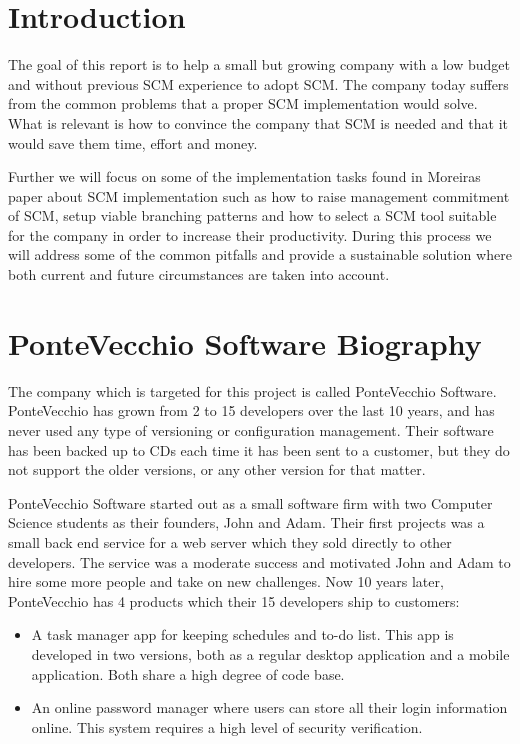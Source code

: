 \documentclass[10pt]{article}
\begin{document}
\section{Introduction}
The goal of this report is to help a small but growing company with a low budget and without previous SCM experience to adopt SCM. The company today suffers from the common problems that a proper SCM implementation would solve. What is relevant is how to convince the company that SCM is needed and that it would save them time, effort and money. 

\noindent Further we will focus on some of the implementation tasks found in Moreiras \cite{Moreira} paper about SCM implementation such as how to raise management commitment of SCM, setup viable branching patterns and how to select a SCM tool suitable for the company in order to increase their productivity. During this process we will address some of the common pitfalls and provide a sustainable solution where both current and future circumstances are taken into account.

\section{PonteVecchio Software Biography}
The company which is targeted for this project is called PonteVecchio Software. PonteVecchio has grown from 2 to 15 developers over the last 10 years, and has never used any type of versioning or configuration management. Their software has been backed up to CDs each time it has been sent to a customer, but they do not support the older versions, or any other version for that matter.

\noindent PonteVecchio Software started out as a small software firm with two Computer Science students as their founders, John and Adam. Their first projects was a small back end service for a web server which they sold directly to other developers. The service was a moderate success and motivated John and Adam to hire some more people and take on new challenges. Now 10 years later, PonteVecchio has 4 products which their 15 developers ship to customers:
\begin{itemize}
\item A task manager app for keeping schedules and to-do list. This app is developed in two versions, both as a regular desktop application and a mobile application. Both share a high degree of code base. 
\item An online password manager where users can store all their login information online. This system requires a high level of security verification.
\end{itemize}
\end{document}

